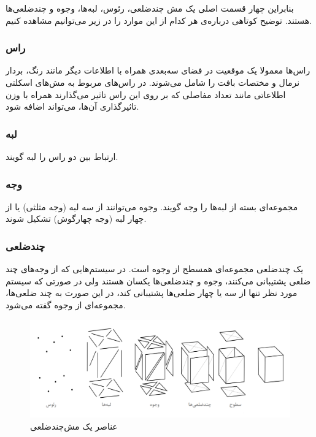 بنابراین چهار قسمت اصلی یک مش چندضلعی، رئوس، لبه‌ها، وجوه و چندضلعی‌ها هستند. توضیح کوتاهی درباره‌ی هر کدام از این موارد را در زیر می‌توانیم مشاهده کنیم.

\subsubsection{راس}
\label{Vertex}
راس‌ها معمولا یک موقعیت در فضای سه‌بعدی همراه با اطلاعات دیگر مانند رنگ، بردار نرمال و مختصات بافت را شامل می‌شوند. 
در راس‌های مربوط به مش‌های اسکلتی اطلاعاتی مانند تعداد مفاصلی که بر روی این راس تاثیر می‌گذارند همراه با وزن تاثیرگذاری آن‌ها، می‌تواند اضافه شود.

\subsubsection{لبه}
ارتباط بین دو راس را لبه گویند.

\subsubsection{وجه}
مجموعه‌ای بسته از لبه‌ها را وجه گویند. وجوه می‌توانند از سه لبه 
(وجه مثلثی)
یا از چهار لبه
(وجه چهارگوش)
تشکیل شوند.

\subsubsection{چندضلعی}
یک چندضلعی مجموعه‌ای همسطح از وجوه است.
در سیستم‌هایی که از وجه‌های چند ضلعی پشتیبانی می‌کنند، وجوه و چندضلعی‌ها یکسان هستند ولی در صورتی که سیستم مورد نظر تنها از سه یا چهار ضلعی‌ها پشتیبانی کند، در این صورت به چند ضلعی‌ها، مجموعه‌ای از وجوه گفته می‌شود.


\begin{figure}[ht]
	\centerline{\includegraphics[width=\textwidth,height=\textheight,keepaspectratio]{Figures/Ch2/Mesh.png}}

	\caption{عناصر یک مش‌چندضلعی\cite{PolygonMeshWikipedia}}
	\label{fig:PolygonMesh}
\end{figure}


